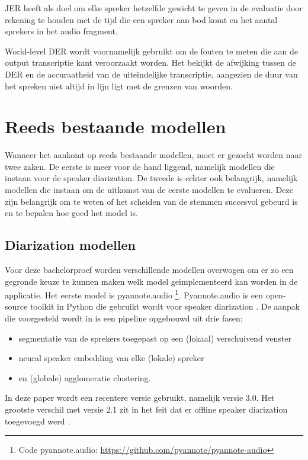 JER heeft als doel om elke spreker hetzelfde gewicht te geven in de evaluatie door rekening te houden met de tijd die een spreker aan bod komt en het aantal sprekers in het audio fragment\autocite{Park2021}.

World-level DER wordt voornamelijk gebruikt om de fouten te meten die aan de output transcriptie kant veroorzaakt worden. Het bekijkt de afwijking tussen de DER en de accuraatheid van de uiteindelijke transcriptie, aangezien de duur van het spreken niet altijd in lijn ligt met de grenzen van woorden. \autocite{Park2021}


\section{Reeds bestaande modellen}
Wanneer het aankomt op reeds bestaande modellen, moet er gezocht worden naar twee zaken. De eerste is meer voor de hand liggend, namelijk modellen die instaan voor de speaker diarization. De tweede is echter ook belangrijk, namelijk modellen die instaan om de uitkomst van de eerste modellen te evalueren. Deze zijn belangrijk om te weten of het scheiden van de stemmen succesvol gebeurd is en te bepalen hoe goed het model is.

\subsection{Diarization modellen}
Voor deze bachelorproef worden verschillende modellen overwogen om er zo een gegronde keuze te kunnen maken welk model geïmplementeerd kan worden in de applicatie. Het eerste model is pyannote.audio \footnote{Code pyannote.audio: \url{https://github.com/pyannote/pyannote-audio}}. Pyannote.audio is een open-source toolkit in Python die gebruikt wordt voor speaker diarization \autocite{Bredin2023}. De aanpak die voorgesteld wordt in \textcite{Bredin2023} is een pipeline opgebouwd uit drie fasen:
\begin{itemize}
	\item segmentatie van de sprekers toegepast op een (lokaal) verschuivend venster
	\item neural speaker embedding van elke (lokale) spreker
	\item en (globale) agglomeratie clustering.
\end{itemize}
In deze paper wordt een recentere versie gebruikt, namelijk versie 3.0. Het grootste verschil met versie 2.1 zit in het feit dat er offline speaker diarization toegevoegd werd \textcite{Bredin2024}.

